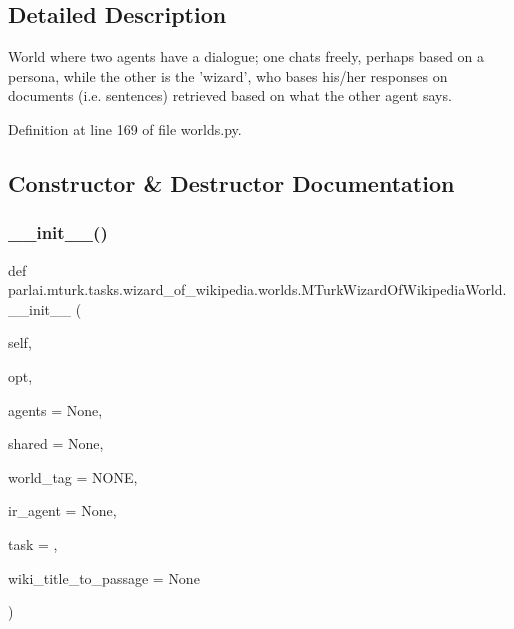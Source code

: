\subsection{Detailed Description}
\begin{DoxyVerb}World where two agents have a dialogue; one chats freely, perhaps based on a
persona, while the other is the 'wizard', who bases his/her responses on documents
(i.e. sentences) retrieved based on what the other agent says.
\end{DoxyVerb}
 

Definition at line 169 of file worlds.\+py.



\subsection{Constructor \& Destructor Documentation}
\mbox{\label{classparlai_1_1mturk_1_1tasks_1_1wizard__of__wikipedia_1_1worlds_1_1MTurkWizardOfWikipediaWorld_ae471a27f4c1d70786c2e56d99923cbbc}} 
\subsubsection{\texorpdfstring{\+\_\+\+\_\+init\+\_\+\+\_\+()}{\_\_init\_\_()}}
{\footnotesize\ttfamily def parlai.\+mturk.\+tasks.\+wizard\+\_\+of\+\_\+wikipedia.\+worlds.\+M\+Turk\+Wizard\+Of\+Wikipedia\+World.\+\_\+\+\_\+init\+\_\+\+\_\+ (\begin{DoxyParamCaption}\item[{}]{self,  }\item[{}]{opt,  }\item[{}]{agents = {\ttfamily None},  }\item[{}]{shared = {\ttfamily None},  }\item[{}]{world\+\_\+tag = {\ttfamily \textquotesingle{}NONE\textquotesingle{}},  }\item[{}]{ir\+\_\+agent = {\ttfamily None},  }\item[{}]{task = {\ttfamily \textquotesingle{}\textquotesingle{}},  }\item[{}]{wiki\+\_\+title\+\_\+to\+\_\+passage = {\ttfamily None} }\end{DoxyParamCaption})}




